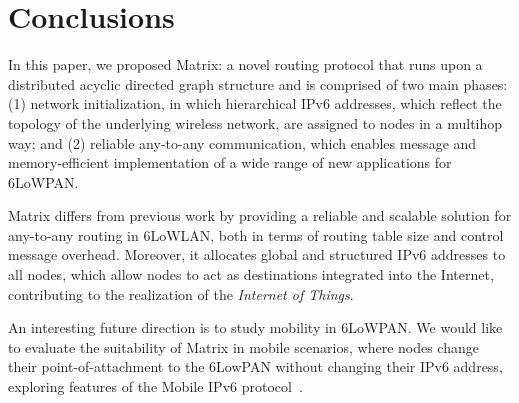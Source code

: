 \section{Conclusions}\label{sec:conclusion}

In this paper, we proposed Matrix: a novel routing protocol that runs upon a distributed acyclic directed graph structure and is comprised of two
main phases: (1) network initialization, in which hierarchical IPv6
addresses, which reflect the topology of the underlying wireless
network, are assigned to nodes in a multihop way; and (2) reliable
any-to-any communication, which enables message and memory-efficient
implementation of a wide range of new applications for 6LoWPAN.

Matrix differs from previous work by providing a reliable and scalable solution
for any-to-any routing in 6LoWLAN, both in terms of routing table size and
control message overhead. Moreover, it allocates global and structured IPv6
addresses to all nodes, which allow nodes to act as destinations integrated into the Internet, contributing to the realization of the \textit{Internet of Things}.

An interesting future direction is to study mobility in 6LoWPAN. We would like to evaluate the suitability of Matrix in mobile scenarios, where nodes change their point-of-attachment to the 6LowPAN without changing their IPv6 address, exploring features of the Mobile IPv6 protocol~\cite{mobileip}.




